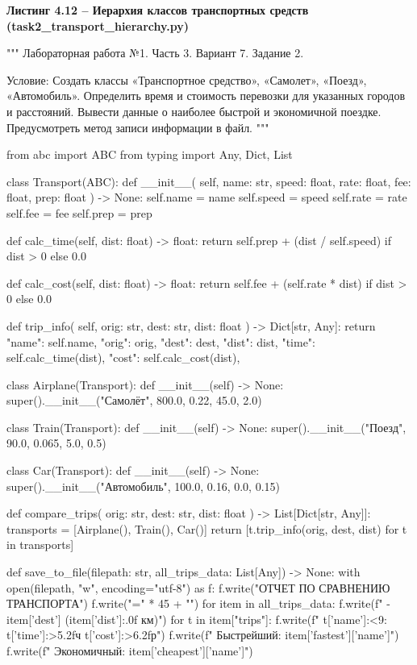 \documentclass[14pt,a4paper]{extarticle}
\newcommand{\listingtitle}[1]{%
  \par\vspace{8pt}%
  \noindent\hspace*{1.25cm}\textbf{#1}\par\vspace{2pt}%
}
\begin{document}
\listingtitle{Листинг 4.12 -- Иерархия классов транспортных средств (task2\_transport\_hierarchy.py)}
\begin{CodeListing}
"""
Лабораторная работа №1. Часть 3.
Вариант 7. Задание 2.

Условие:
Создать классы «Транспортное средство», «Самолет», «Поезд», «Автомобиль».
Определить время и стоимость перевозки для указанных городов и расстояний.
Вывести данные о наиболее быстрой и экономичной поездке.
Предусмотреть метод записи информации в файл.
"""

from abc import ABC
from typing import Any, Dict, List


class Transport(ABC):
    def __init__(
        self, name: str, speed: float, rate: float, fee: float, prep: float
    ) -> None:
        self.name = name
        self.speed = speed
        self.rate = rate
        self.fee = fee
        self.prep = prep

    def calc_time(self, dist: float) -> float:
        return self.prep + (dist / self.speed) if dist > 0 else 0.0

    def calc_cost(self, dist: float) -> float:
        return self.fee + (self.rate * dist) if dist > 0 else 0.0

    def trip_info(
        self, orig: str, dest: str, dist: float
    ) -> Dict[str, Any]:
        return {
            "name": self.name,
            "orig": orig,
            "dest": dest,
            "dist": dist,
            "time": self.calc_time(dist),
            "cost": self.calc_cost(dist),
        }


class Airplane(Transport):
    def __init__(self) -> None:
        super().__init__("Самолёт", 800.0, 0.22, 45.0, 2.0)


class Train(Transport):
    def __init__(self) -> None:
        super().__init__("Поезд", 90.0, 0.065, 5.0, 0.5)


class Car(Transport):
    def __init__(self) -> None:
        super().__init__("Автомобиль", 100.0, 0.16, 0.0, 0.15)


def compare_trips(
    orig: str, dest: str, dist: float
) -> List[Dict[str, Any]]:
    transports = [Airplane(), Train(), Car()]
    return [t.trip_info(orig, dest, dist) for t in transports]


def save_to_file(filepath: str, all_trips_data: List[Any]) -> None:
    with open(filepath, "w", encoding="utf-8") as f:
        f.write("ОТЧЕТ ПО СРАВНЕНИЮ ТРАНСПОРТА\n")
        f.write("=" * 45 + "\n")
        for item in all_trips_data:
            f.write(f" - {item['dest']} ({item['dist']:.0f} км)\n")
            for t in item["trips"]:
                f.write(f"  {t['name']:<9}: {t['time']:>5.2f}ч {t['cost']:>6.2f}р\n")
            f.write(f"  Быстрейший:  {item['fastest']['name']}\n")
            f.write(f"  Экономичный: {item['cheapest']['name']}\n")



\end{CodeListing}
\end{document}
